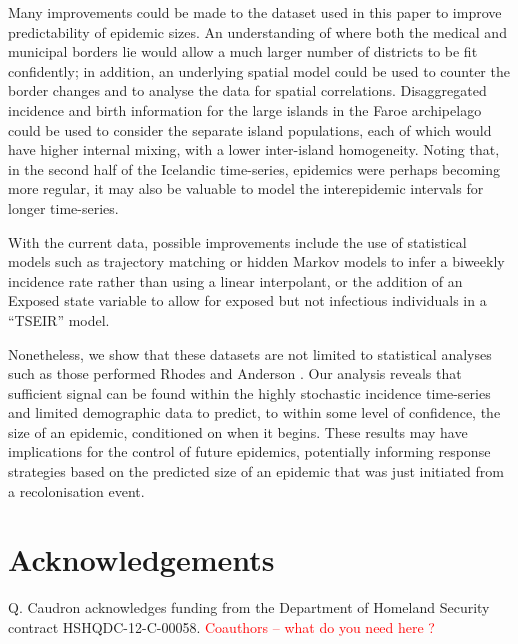 \documentclass[10pt]{article}
\begin{document}
Many improvements could be made to the dataset used in this paper to improve predictability of epidemic sizes. An understanding of where both the medical and municipal borders lie would allow a much larger number of districts to be fit confidently; in addition, an underlying spatial model could be used to counter the border changes and to analyse the data for spatial correlations. Disaggregated incidence and birth information for the large islands in the Faroe archipelago could be used to consider the separate island populations, each of which would have higher internal mixing, with a lower inter-island homogeneity. Noting that, in the second half of the Icelandic time-series, epidemics were perhaps becoming more regular, it may also be valuable to model the interepidemic intervals for longer time-series. 

With the current data, possible improvements include the use of statistical models such as trajectory matching or hidden Markov models to infer a biweekly incidence rate rather than using a linear interpolant, or the addition of an Exposed state variable to allow for exposed but not infectious individuals in a ``TSEIR'' model. 

Nonetheless, we show that these datasets are not limited to statistical analyses such as those performed Rhodes and Anderson \cite{Rhodes1996a, Rhodes1996b}. Our analysis reveals that sufficient signal can be found within the highly stochastic incidence time-series and limited demographic data to predict, to within some level of confidence, the size of an epidemic, conditioned on when it begins. These results may have implications for the control of future epidemics, potentially informing response strategies based on the predicted size of an epidemic that was just initiated from a recolonisation event.






















\section*{Acknowledgements}

Q. Caudron acknowledges funding from the Department of Homeland Security contract HSHQDC-12-C-00058. \textcolor{red}{Coauthors -- what do you need here ?}
\end{document}

